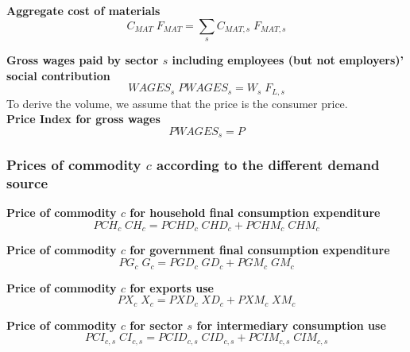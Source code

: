 \documentclass[12pt]{article}
\numberwithin{equation}{section}
\begin{document}
\noindent\textbf{Aggregate cost of materials} \\
\begin{dmath}
C_{MAT} \; F_{MAT} = \sum_{s} C_{MAT, s} \; F_{MAT, s}
\end{dmath}

\noindent\textbf{Gross wages paid by sector $s$ including employees (but not employers)' social contribution} \\
\begin{dmath}
WAGES_{s} \; PWAGES_{s} = W_{s} \; F_{L, s}
\end{dmath}
To derive the volume, we assume that the price is the consumer price. \\

\noindent\textbf{Price Index for gross wages} \\
\begin{dmath}
PWAGES_{s} = P
\end{dmath}





\subsubsection{Prices of commodity $c$ according to the different demand source}



\noindent\textbf{Price of commodity $c$ for household final consumption expenditure} \\
\begin{dmath}
PCH_{c} \; CH_{c} = PCHD_{c} \; CHD_{c} + PCHM_{c} \; CHM_{c}
\end{dmath}

\noindent\textbf{Price of commodity $c$ for government final consumption expenditure} \\
\begin{dmath}
PG_{c} \; G_{c} = PGD_{c} \; GD_{c} + PGM_{c} \; GM_{c}
\end{dmath}

\noindent\textbf{Price of commodity $c$ for exports use} \\
\begin{dmath}
PX_{c} \; X_{c} = PXD_{c} \; XD_{c} + PXM_{c} \; XM_{c}
\end{dmath}

\noindent\textbf{Price of commodity $c$ for sector $s$ for intermediary consumption use} \\
\begin{dmath}
PCI_{c, s} \; CI_{c, s} = PCID_{c, s} \; CID_{c, s} + PCIM_{c, s} \; CIM_{c, s}
\end{dmath}
\end{document}
